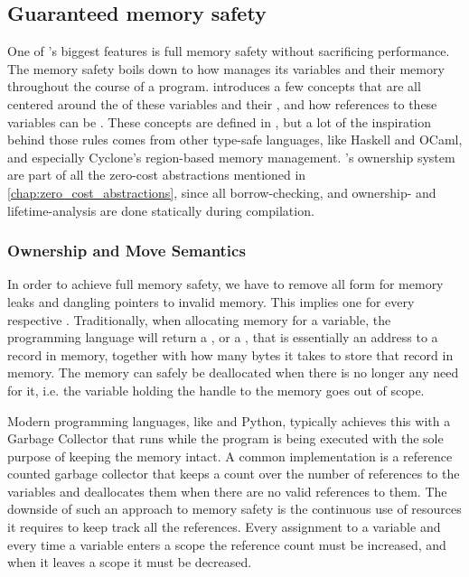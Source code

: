 \subsection{Guaranteed memory safety}
\label{sec:guaranteed_memory_safety}

One of {\rust}'s biggest features is full memory safety without sacrificing performance.
The memory safety boils down to how {\rust} manages its variables and their memory throughout the course of a program.
{\rust} introduces a few concepts that are all centered around the  of these variables and their , and how references to these variables can be .
These concepts are defined in {\rust}, but a lot of the inspiration behind those rules comes from other type-safe languages, like Haskell and OCaml, and especially Cyclone's \cite{Grossman2002,Swamy2006} region-based memory management.
\rust's ownership system are part of all the zero-cost abstractions mentioned in \autoref{chap:zero_cost_abstractions}, since all borrow-checking, and ownership- and lifetime-analysis are done statically during compilation.

\subsubsection{Ownership and Move Semantics}
\label{sec:back:rust:own}

In order to achieve full memory safety, we have to remove all form for memory leaks and dangling pointers to invalid memory.
This implies one  for every respective .
Traditionally, when allocating memory for a variable, the programming language will return a ,  or a , that is essentially an address to a record in memory, together with how many bytes it takes to store that record in memory.
The memory can safely be deallocated when there is no longer any need for it, i.e. the variable holding the handle to the memory goes out of scope.

Modern programming languages, like {\Java} and Python, typically achieves this with a Garbage Collector that runs while the program is being executed with the sole purpose of keeping the memory intact.
A common implementation is a reference counted garbage collector that keeps a count over the number of references to the variables and deallocates them when there are no valid references to them.
The downside of such an approach to memory safety is the continuous use of resources it requires to keep track all the references.
Every assignment to a variable and every time a variable enters a scope the reference count must be increased, and when it leaves a scope it must be decreased.

